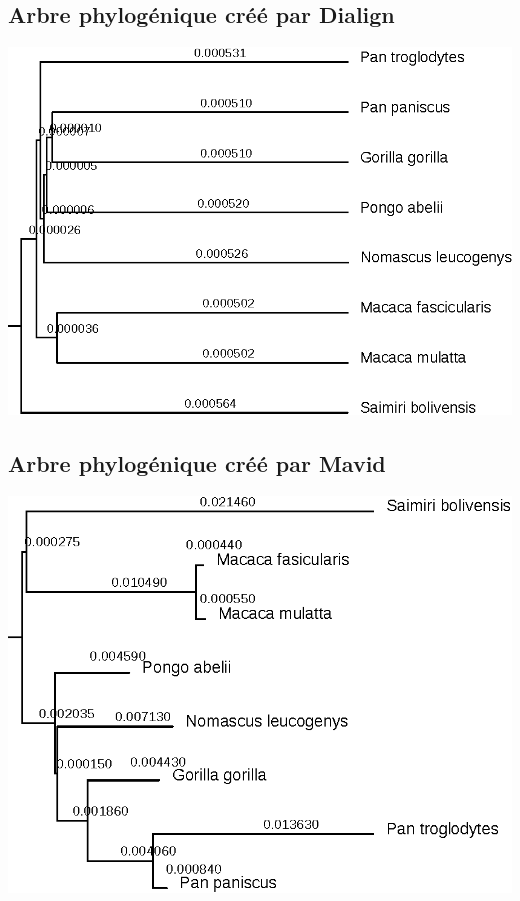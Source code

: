\documentclass[10.8pt]{article} %
\begin{document}
\subsection{Arbre phylogénique créé par Dialign}\label{21}
\includegraphics{annexes/q4_cds/dialign/foxp4_ortho.eps}

\subsection{Arbre phylogénique créé par Mavid}\label{22}
\includegraphics{annexes/q4_cds/Mavid/mavid.eps}
\end{document}
